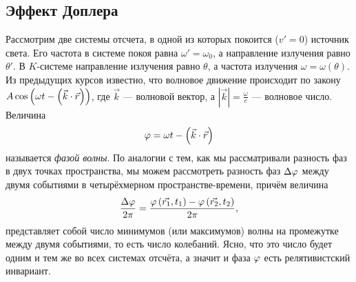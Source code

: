 \subsection{Эффект Доплера}
    \begin{figure}[h]
        \centering{
            
        }
    \end{figure}
    Рассмотрим две системы отсчета, в одной из которых покоится ($v' = 0$) источник света. Его частота в системе покоя равна $\omega' = \omega_0$,
    а направление излучения равно $\theta'$. В $K$-системе направление излучения равно $\theta$, а частота излучения $\omega = \omega(\theta).$
    Из предыдущих курсов известно, что волновое движение происходит по закону $A\cos\left({\omega t - \left({\vec{k}\cdot\vec{r}}\right)}\right)$,
    где $\vec{k}$ --- волновой вектор, а $\left|\vec{k}\right| = \frac{\omega}{c}$ --- волновое число. Величина
    \[
        \varphi = \omega t - \left({\vec{k}\cdot\vec{r}}\right)
    \]
    называется \textit{фазой волны}. По аналогии с тем, как мы рассматривали разность фаз в двух точках пространства,
    мы можем рассмотреть разность фаз $\Delta\varphi$ между двумя событиями в четырёхмерном пространстве-времени, причём величина
    \[
        \frac{\Delta\varphi}{2\pi} = \frac{\varphi\left({\vec{r_1}, t_1}\right) - \varphi\left({\vec{r_2}, t_2}\right)}{2\pi},
    \]
    представляет собой число минимумов (или максимумов) волны на промежутке между двумя событиями, то есть число колебаний.
    Ясно, что это число будет одним и тем же во всех системах отсчёта, а значит и фаза $\varphi$ есть релятивистский инвариант.
 
